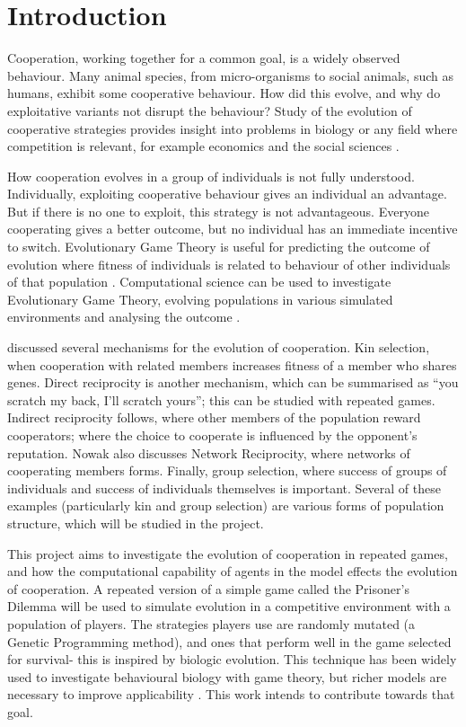 \documentclass[a4paper,11pt]{article}
\begin{document}
\section{Introduction}
Cooperation, working together for a common goal, is a widely observed behaviour. 
Many animal species, from micro-organisms to social animals, such as humans, exhibit some cooperative behaviour. 
How did this evolve, and why do exploitative variants not disrupt the behaviour? 
Study of the evolution of cooperative strategies provides insight into problems in biology or any field where competition is relevant, for example economics and the social sciences \citep{Axelrod1997}. 

How cooperation evolves in a group of individuals is not fully understood. 
Individually, exploiting cooperative behaviour gives an individual an advantage. 
But if there is no one to exploit, this strategy is not advantageous. 
Everyone cooperating gives a better outcome, but no individual has an immediate incentive to switch. 
Evolutionary Game Theory is useful for predicting the outcome of evolution where fitness of individuals is related to behaviour of other individuals of that population \citep{maynard-smith:book:1982}. 
Computational science can be used to investigate Evolutionary Game Theory, evolving populations in various simulated environments and analysing the outcome \citep{fogel1993evolving}. 

\citet{nowak:Science:2006} discussed several mechanisms for the evolution of cooperation. 
Kin selection, when cooperation with related members increases fitness of a member who shares genes. 
Direct reciprocity is another mechanism, which can be summarised as ``you scratch my back, I'll scratch yours''; this can be studied with repeated games. 
Indirect reciprocity follows, where other members of the population reward cooperators; where the choice to cooperate is influenced by the opponent's reputation. 
Nowak also discusses Network Reciprocity, where networks of cooperating members forms. 
Finally, group selection, where success of groups of individuals and success of individuals themselves is important. 
Several of these examples (particularly kin and group selection) are various forms of population structure, which will be studied in the project. 

This project aims to investigate the evolution of cooperation in repeated games, and how the computational capability of agents in the model effects the evolution of cooperation. 
A repeated version of a simple game called the Prisoner's Dilemma will be used to simulate evolution in a competitive environment with a population of players. 
The strategies players use are randomly mutated (a Genetic Programming method), and ones that perform well in the game selected for survival- this is inspired by biologic evolution. 
This technique has been widely used to investigate behavioural biology with game theory, but richer models are necessary to improve applicability \citep{McNamara2013}. 
This work intends to contribute towards that goal. 
\end{document}
